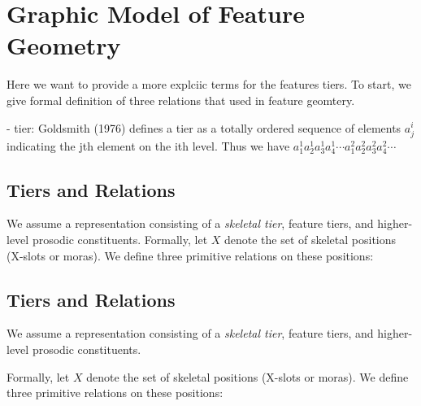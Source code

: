 \documentclass[11pt]{article}
\begin{document}
\section{Graphic Model of Feature Geometry}

Here we want to provide a more explciic terms for the features tiers. To start, we give formal definition of three
relations that used in feature geomtery.

- tier: Goldsmith (1976) defines a tier as a totally ordered  sequence of elements $a^i_j$ indicating the jth element on the ith level. Thus we have
\(
a^1_1a^1_2a^1_3a^1_4 \cdots
a^2_1a^2_2a^2_3a^2_4 \cdots
\)

\subsection*{Tiers and Relations}

We assume a representation consisting of a \emph{skeletal tier}, feature tiers, and higher-level prosodic constituents. 
Formally, let $X$ denote the set of skeletal positions (X-slots or moras). 
We define three primitive relations on these positions:


\subsection*{Tiers and Relations}

We assume a representation consisting of a \emph{skeletal tier}, feature tiers, 
and higher-level prosodic constituents. 


Formally, let $X$ denote the set of skeletal positions (X-slots or moras). 
We define three primitive relations on these positions:
\end{document}
